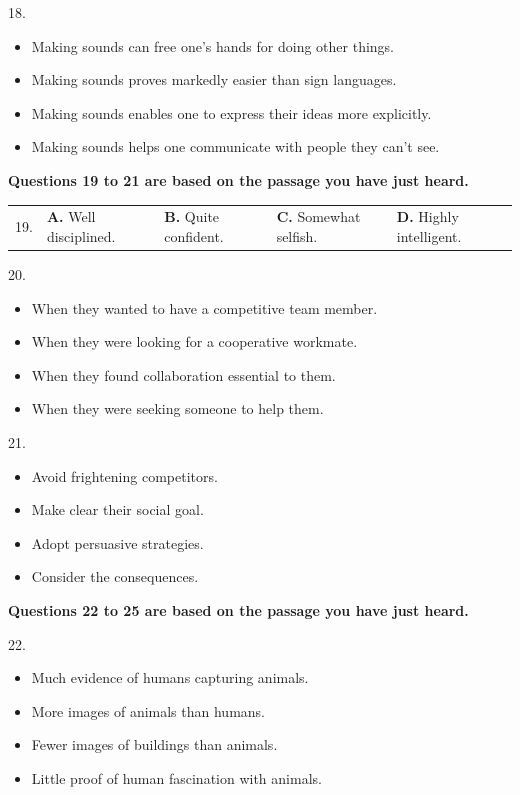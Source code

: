 \documentclass[UTF8,11pt]{ctexart}
\begin{document}
18.


\begin{itemize}[leftmargin=2em,itemsep=.2em,topsep=.4em]\item[A.] Making sounds can free one’s hands for doing other things.
\item[B.] Making sounds proves markedly easier than sign languages.
\item[C.] Making sounds enables one to express their ideas more explicitly.
\item[D.] Making sounds helps one communicate with people they can’t see.
\end{itemize}

\textbf{Questions 19 to 21 are based on the passage you have just heard.}


\noindent\begin{tabularx}{\linewidth}{@{}lXXXX@{}}19. & \textbf{A.} Well disciplined. & \textbf{B.} Quite confident. & \textbf{C.} Somewhat selfish. & \textbf{D.} Highly intelligent.\\\end{tabularx}\par

20.


\begin{itemize}[leftmargin=2em,itemsep=.2em,topsep=.4em]\item[A.] When they wanted to have a competitive team member.
\item[B.] When they were looking for a cooperative workmate.
\item[C.] When they found collaboration essential to them.
\item[D.] When they were seeking someone to help them.
\end{itemize}

21.


\begin{itemize}[leftmargin=2em,itemsep=.2em,topsep=.4em]\item[A.] Avoid frightening competitors.
\item[B.] Make clear their social goal.
\item[C.] Adopt persuasive strategies.
\item[D.] Consider the consequences.
\end{itemize}

\textbf{Questions 22 to 25 are based on the passage you have just heard.}


22.


\begin{itemize}[leftmargin=2em,itemsep=.2em,topsep=.4em]\item[A.] Much evidence of humans capturing animals.
\item[B.] More images of animals than humans.
\item[C.] Fewer images of buildings than animals.
\item[D.] Little proof of human fascination with animals.
\end{itemize}
\end{document}
